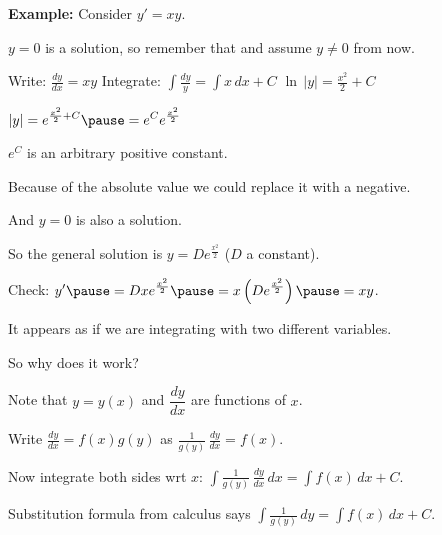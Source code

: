 \documentclass[10pt,aspectratio=169]{beamer}
\begin{document}
\begin{frame}

\textbf{Example:}
Consider
$y' = xy$.

\medskip
\pause

$y=0$ is a solution, so remember that and assume $y\not= 0$ from now.

\medskip
\pause

Write: \qquad $\displaystyle \frac{dy}{dx} = xy$
\pause
\qquad Integrate:
$\displaystyle
\int \frac{dy}{y} = \int x\,dx + C$
\pause
\wthus
$\displaystyle
\ln \, \lvert y\rvert = \frac{x^2}{2} + C$

\medskip
\pause

\thus\quad
$\displaystyle \lvert y \rvert = e^{\frac{x^2}{2} + C}
\pause
 = e^C e^{\frac{x^2}{2}}$

\medskip
\pause

$e^C$ is an arbitrary positive constant.

\pause
Because of the absolute value we could replace it with a negative.

\pause
And $y=0$ is also a solution.

\medskip
\pause

So the general solution is \quad $\displaystyle y = D e^{\frac{x^2}{2}}$
\quad ($D$ a constant).

\medskip
\pause

Check:
$\displaystyle
y' \pause = D x e^{\frac{x^2}{2}} \pause = x \left( D e^{\frac{x^2}{2}}
\right) \pause = xy$.
\qquad
{\Large\checkmark}
\end{frame}

\begin{frame}
It appears as if we are integrating with two different variables.

\medskip
\pause

So why does it work?

\medskip
\pause

Note that $y=y(x)$ and $\dfrac{dy}{dx}$ are functions of $x$.

\medskip
\pause

Write
\quad
$\displaystyle \frac{dy}{dx} = f(x)g(y)$
\quad
as
\quad
$\displaystyle
\frac{1}{g(y)}\,\frac{dy}{dx} = f(x)$.

\medskip
\pause

Now integrate both sides wrt $x$:
\quad
$\displaystyle
\int \frac{1}{g(y)}\,\frac{dy}{dx} \,dx = \int f(x) \,dx + C$.

\medskip
\pause

Substitution formula from calculus says
\quad $\displaystyle
\int \frac{1}{g(y)}\,dy = \int f(x) \,dx + C$.
\quad
{\Large\checkmark}

\end{frame}
\end{document}
